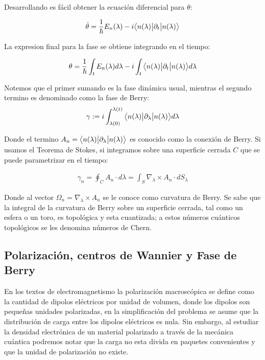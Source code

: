 Desarrollando es fácil obtener la ecuación diferencial para $\theta$:

\begin{align}
    \dot{\theta} = \frac{1}{\hbar} E_n(\lambda) - i \big \langle{n(\lambda)}\big | {\partial_t} \big | {n(\lambda)} \big \rangle
\end{align}

La expresion final para la fase se obtiene integrando en el tiempo:

\begin{align}
   \theta = \frac{1}{\hbar} \int_t E_n(\lambda) d\lambda - i \int_t \big \langle{n(\lambda)}\big | {\partial_t} \big | {n(\lambda)} \big \rangle d\lambda
\end{align}

Notemos que el primer sumando es la fase dinámica usual, mientras el segundo termino es denominado como la fase de Berry:
\begin{align}
    \gamma := i \int_{\lambda(0)}^{\lambda(t)} \big \langle{n(\lambda)}\big | {\partial_\lambda} \big | {n(\lambda)} \big \rangle d\lambda
\end{align}

Donde el termino $A_n = \big \langle{n(\lambda)}\big | {\partial_\lambda} \big | {n(\lambda)} \big \rangle$ es conocido como la conexión de Berry. Si usamos el Teorema de Stokes, si integramos sobre una superficie cerrada $C$ que se puede parametrizar en el tiempo:

\begin{align}
    \gamma_n = \oint_C A_n \cdot d\lambda = \int_S \nabla_\lambda \times A_n \cdot dS_\lambda
\end{align}


Donde al vector $\Omega_n = \nabla_\lambda \times A_n$ se le conoce como curvatura de Berry. Se sabe que la integral de la curvatura de Berry sobre un superficie cerrada, tal como un esfera o un toro, es topológica y esta cuantizada; a estos números cuánticos topológicos se les denomina números de Chern.

\subsection{Polarización, centros de Wannier y Fase de Berry}

En los textos de electromagnetismo la polarización macroscópica se define como la cantidad de dipolos eléctricos por unidad de volumen, donde los dipolos son pequeñas unidades polarizadas, en la simplificación del problema se asume que la distribución de carga entre los dipolos eléctricos es nula. Sin embargo, al estudiar la densidad electrónica de un material polarizado a través de la mecánica cuántica podremos notar que la carga no esta divida en paquetes convenientes y que la unidad de polarización no existe. 

